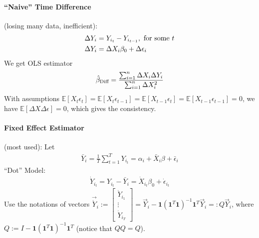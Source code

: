\documentclass[11pt]{elegantbook}
\begin{document}
\paragraph*{``Naive'' Time Difference}(losing many data, inefficient):
\begin{equation}
    \begin{aligned}
        \Delta Y_i&=Y_{i_t}-Y_{i_{t-1}}, \textnormal{ for some }t\\
        \Delta Y_i&=\Delta X_i\beta_0+\Delta\epsilon_i
    \end{aligned}
    \nonumber
\end{equation}
We get OLS estimator
\begin{equation}
    \begin{aligned}
        \hat{\beta}_\textnormal{Diff}=\frac{\sum_{i=1}^n \Delta X_i\Delta Y_i}{\sum_{i=1}^n \Delta X_i^2}
    \end{aligned}
    \nonumber
\end{equation}
With assumptions $\mathbb{E}[X_t\epsilon_t]=\mathbb{E}[X_t\epsilon_{t-1}]=\mathbb{E}[X_{t-1}\epsilon_t]=\mathbb{E}[X_{t-1}\epsilon_{t-1}]=0$, we have $\mathbb{E}[\Delta X\Delta\epsilon]=0$, which gives the consistency.

\paragraph*{Fixed Effect Estimator}(most used):
Let
\begin{equation}
    \begin{aligned}
        \bar{Y}_i=\frac{1}{T}\sum_{t=1}^T Y_{i_t}=\alpha_i+\bar{X}_i\beta+\bar{\epsilon}_i
    \end{aligned}
    \nonumber
\end{equation}
``Dot'' Model:
\begin{equation}
    \begin{aligned}
        \dot{Y}_{i_t}=Y_{i_t}-\bar{Y}_i=\dot{X}_{i_t}\beta_0+\dot{\epsilon}_{i_t}
    \end{aligned}
    \nonumber
\end{equation}
Use the notations of vectors $\vec{\dot{Y}}_{i}:=\begin{bmatrix}
    \dot{Y}_{i_1}\\
    \vdots\\
    \dot{Y}_{i_T}
\end{bmatrix}=\vec{Y}_i-\mathbf{1}\left(\mathbf{1}^T \mathbf{1}\right)^{-1} \mathbf{1}^T \vec{Y}_i=:Q \vec{Y}_i$, where $Q:=I-\mathbf{1}\left(\mathbf{1}^T \mathbf{1}\right)^{-1} \mathbf{1}^T$ (notice that $QQ=Q$).
\end{document}
